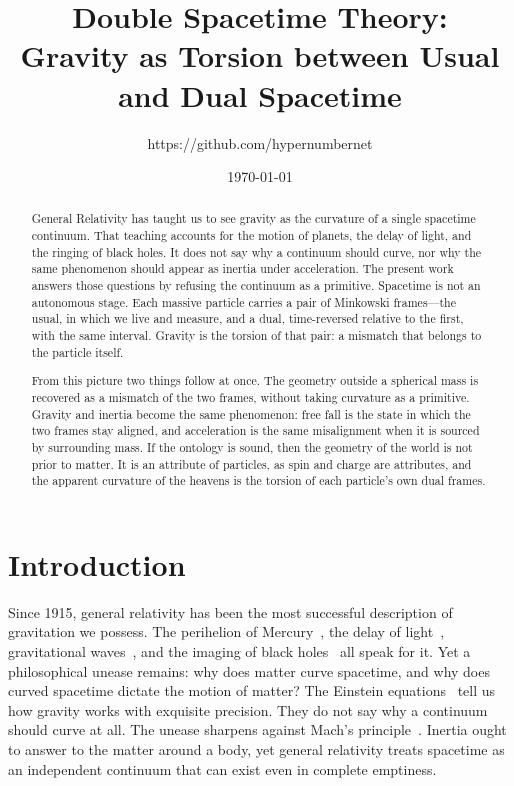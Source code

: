 \documentclass[a4paper]{article}
\title{Double Spacetime Theory:\\ Gravity as Torsion between Usual and Dual Spacetime}
\author{https://github.com/hypernumbernet}
\date{\today}
\begin{document}
\maketitle

\begin{abstract}
General Relativity has taught us to see gravity as the curvature of a single spacetime continuum. That teaching accounts for the motion of planets, the delay of light, and the ringing of black holes. It does not say why a continuum should curve, nor why the same phenomenon should appear as inertia under acceleration. The present work answers those questions by refusing the continuum as a primitive. Spacetime is not an autonomous stage. Each massive particle carries a pair of Minkowski frames---the usual, in which we live and measure, and a dual, time-reversed relative to the first, with the same interval. Gravity is the torsion of that pair: a mismatch that belongs to the particle itself.

From this picture two things follow at once. The geometry outside a spherical mass is recovered as a mismatch of the two frames, without taking curvature as a primitive. Gravity and inertia become the same phenomenon: free fall is the state in which the two frames stay aligned, and acceleration is the same misalignment when it is sourced by surrounding mass. If the ontology is sound, then the geometry of the world is not prior to matter. It is an attribute of particles, as spin and charge are attributes, and the apparent curvature of the heavens is the torsion of each particle's own dual frames.
\end{abstract}

\section{Introduction}
\label{sec:introduction}

Since 1915, general relativity has been the most successful description of gravitation we possess. The perihelion of Mercury~\cite{einstein1915}, the delay of light~\cite{shapiro1964}, gravitational waves~\cite{abbott2016}, and the imaging of black holes~\cite{eht2019} all speak for it. Yet a philosophical unease remains: why does matter curve spacetime, and why does curved spacetime dictate the motion of matter? The Einstein equations~\cite{einstein1916} tell us how gravity works with exquisite precision. They do not say why a continuum should curve at all. The unease sharpens against Mach's principle~\cite{mach1883}. Inertia ought to answer to the matter around a body, yet general relativity treats spacetime as an independent continuum that can exist even in complete emptiness.
\end{document}
